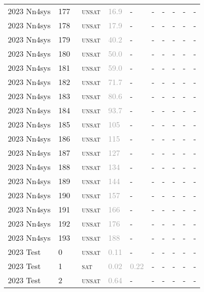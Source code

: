\begin{center}
{\begin{longtable}{@{}llllllllll@{}}
2023 Nn4sys & 177 & ~\textsc{unsat} & \textcolor{darkgray}{16.9} & - & - & - & - & - & - \\
2023 Nn4sys & 178 & ~\textsc{unsat} & \textcolor{darkgray}{17.9} & - & - & - & - & - & - \\
2023 Nn4sys & 179 & ~\textsc{unsat} & \textcolor{darkgray}{40.2} & - & - & - & - & - & - \\
2023 Nn4sys & 180 & ~\textsc{unsat} & \textcolor{darkgray}{50.0} & - & - & - & - & - & - \\
2023 Nn4sys & 181 & ~\textsc{unsat} & \textcolor{darkgray}{59.0} & - & - & - & - & - & - \\
2023 Nn4sys & 182 & ~\textsc{unsat} & \textcolor{darkgray}{71.7} & - & - & - & - & - & - \\
2023 Nn4sys & 183 & ~\textsc{unsat} & \textcolor{darkgray}{80.6} & - & - & - & - & - & - \\
2023 Nn4sys & 184 & ~\textsc{unsat} & \textcolor{darkgray}{93.7} & - & - & - & - & - & - \\
2023 Nn4sys & 185 & ~\textsc{unsat} & \textcolor{darkgray}{105} & - & - & - & - & - & - \\
2023 Nn4sys & 186 & ~\textsc{unsat} & \textcolor{darkgray}{115} & - & - & - & - & - & - \\
2023 Nn4sys & 187 & ~\textsc{unsat} & \textcolor{darkgray}{127} & - & - & - & - & - & - \\
2023 Nn4sys & 188 & ~\textsc{unsat} & \textcolor{darkgray}{134} & - & - & - & - & - & - \\
2023 Nn4sys & 189 & ~\textsc{unsat} & \textcolor{darkgray}{144} & - & - & - & - & - & - \\
2023 Nn4sys & 190 & ~\textsc{unsat} & \textcolor{darkgray}{157} & - & - & - & - & - & - \\
2023 Nn4sys & 191 & ~\textsc{unsat} & \textcolor{darkgray}{166} & - & - & - & - & - & - \\
2023 Nn4sys & 192 & ~\textsc{unsat} & \textcolor{darkgray}{176} & - & - & - & - & - & - \\
2023 Nn4sys & 193 & ~\textsc{unsat} & \textcolor{darkgray}{188} & - & - & - & - & - & - \\
\midrule
2023 Test & 0 & ~\textsc{unsat} & \textcolor{darkgray}{0.11} & - & - & - & - & - & - \\
2023 Test & 1 & ~\textsc{sat} & \textcolor{darkgray}{0.02} & \textcolor{darkgray}{0.22} & - & - & - & - & - \\
2023 Test & 2 & ~\textsc{unsat} & \textcolor{darkgray}{0.64} & - & - & - & - & - & - \\

\end{longtable}}
\end{center}
